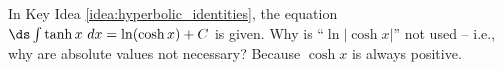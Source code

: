 {In Key Idea \ref{idea:hyperbolic_identities}, the equation $\ds \int \tanh x\ dx = \ln (\cosh x)+C$ is given. Why is ``$\ln |\cosh x|$'' not used -- i.e., why are absolute values not necessary?}
{Because $\cosh x$ is always positive.}
